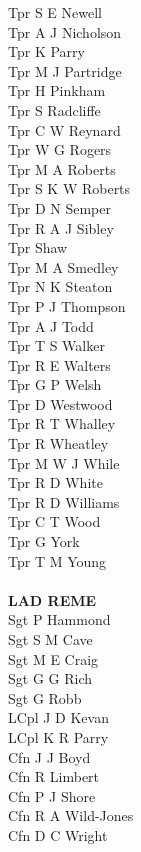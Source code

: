 \begin{multicols}{3}
  Tpr S E Newell \\
  Tpr A J Nicholson \\
  Tpr K Parry \\
  Tpr M J Partridge \\
  Tpr H Pinkham \\
  Tpr S Radcliffe \\
  Tpr C W Reynard \\
  Tpr W G Rogers \\
  Tpr M A Roberts \\
  Tpr S K W Roberts \\
  Tpr D N Semper \\
  Tpr R A J Sibley \\
  Tpr Shaw \\
  Tpr M A Smedley \\
  Tpr N K Steaton \\
  Tpr P J Thompson \\
  Tpr A J Todd \\
  Tpr T S Walker \\
  Tpr R E Walters \\
  Tpr G P Welsh \\
  Tpr D Westwood \\
  Tpr R T Whalley \\
  Tpr R Wheatley \\
  Tpr M W J While \\
  Tpr R D White \\
  Tpr R D Williams \\
  Tpr C T Wood \\
  Tpr G York \\
  Tpr T M Young \\
  \\
  \textbf{LAD REME} \\
  Sgt P Hammond \\
  Sgt S M Cave \\
  Sgt M E Craig \\
  Sgt G G Rich \\
  Sgt G Robb \\
  LCpl J D Kevan \\
  LCpl K R Parry \\
  Cfn J J Boyd \\
  Cfn R Limbert \\
  Cfn P J Shore \\
  Cfn R A Wild-Jones \\
  Cfn D C Wright \\
  \\

\end{multicols}
